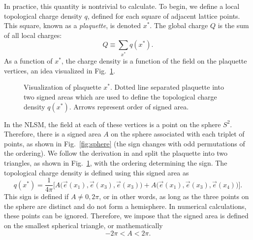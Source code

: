 \documentclass[12pt]{report}
\newcommand{\e}{\vec e}
\begin{document}
In practice, this quantity is nontrivial to calculate. To begin, we define a local topological charge density $q$, defined for each square of adjacent lattice points. This square, known as a \textit{plaquette}, is denoted $x^*$. The global charge $Q$ is the sum of all local charges:
\begin{equation}
    Q \equiv \sum_{x^*} q(x^*).
\end{equation}
As a function of $x^*$, the charge density is a function of the field on the plaquette vertices, an idea visualized in Fig.~\ref{fig:plaquette}.
\begin{figure}
    \centering
    \caption{\label{fig:plaquette} Visualization of plaquette $x^*$. Dotted line separated plaquette into two signed areas which are used to define the topological charge density $q(x^*)$. Arrows represent order of signed area.}
\end{figure}
In the NLSM, the field at each of these vertices is a point on the sphere $S^2$. Therefore, there is a signed area $A$ on the sphere associated with each triplet of points, as shown in Fig.~\ref{fig:sphere} (the sign changes with odd permutations of the ordering). We follow the derivation in \cite{berg1981} and split the plaquette into two triangles, as shown in Fig.~\ref{fig:plaquette}, with the ordering determining the sign. The topological charge density is defined using this signed area as
\begin{equation}
    q(x^*) = \frac{1}{4\pi} \bigg[A\Big(\e(x_1), \e(x_3), \e(x_3)\Big) + A\Big(\e(x_1), \e(x_3), \e(x_4)\Big) \bigg].
\end{equation}
This sign is defined if $A\neq 0, 2\pi$, or in other words, as long as the three points on the sphere are distinct and do not form a hemisphere. In numerical calculations, these points can be ignored. Therefore, we impose that the signed area is defined on the smallest spherical triangle, or mathematically
\begin{equation}
    -2\pi < A < 2\pi.
\end{equation}
\end{document}
